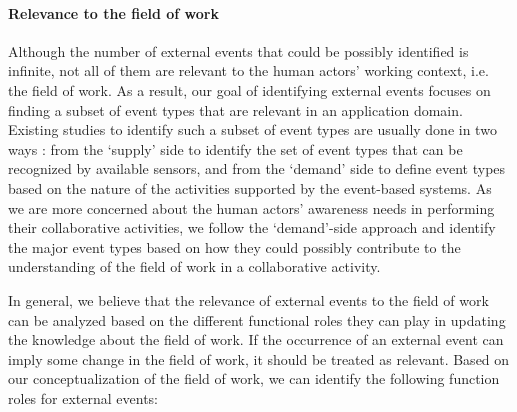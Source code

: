 \paragraph*{Relevance to the field of work} %
\label{par:relevance_to_the_field_of_work}
 Although the number of external events that could be possibly identified is infinite, not all of them are relevant to the human actors' working context, i.e. the field of work. As a result, our goal of identifying external events focuses on finding a subset of event types that are relevant in an application domain. Existing studies to identify such a subset of event types are usually done in two ways \cite{Pottebaum2011}: from the `supply' side to identify the set of event types that can be recognized by available sensors, and from the `demand' side to define event types based on the nature of the activities supported by the event-based systems. As we are more concerned about the human actors' awareness needs in performing their collaborative activities, we follow the `demand'-side approach and identify the major event types based on how they could possibly contribute to the understanding of the field of work in a collaborative activity. 

 In general, we believe that the relevance of external events to the field of work can be analyzed based on the different functional roles they can play in updating the knowledge about the field of work. If the occurrence of an external event can imply some change in the field of work, it should be treated as relevant. Based on our conceptualization of the field of work, we can identify the following function roles for external events:

